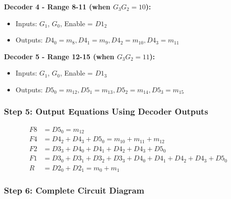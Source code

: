 \documentclass[12pt,a4paper]{article}
\begin{document}
\textbf{Decoder 4 - Range 8-11 (when $G_3G_2 = 10$):}
\begin{itemize}
  \item Inputs: $G_1$, $G_0$, Enable = $D1_2$
  \item Outputs: $D4_0 = m_8, D4_1 = m_9, D4_2 = m_{10}, D4_3 = m_{11}$
\end{itemize}

\textbf{Decoder 5 - Range 12-15 (when $G_3G_2 = 11$):}
\begin{itemize}
  \item Inputs: $G_1$, $G_0$, Enable = $D1_3$
  \item Outputs: $D5_0 = m_{12}, D5_1 = m_{13}, D5_2 = m_{14}, D5_3 = m_{15}$
\end{itemize}

\subsubsection{Step 5: Output Equations Using Decoder Outputs}

\begin{align}
F8 &= D5_0 = m_{12} \\
F4 &= D4_2 + D4_3 + D5_0 = m_{10} + m_{11} + m_{12} \\
F2 &= D3_3 + D4_0 + D4_1 + D4_2 + D4_3 + D5_0 \\
F1 &= D3_0 + D3_1 + D3_2 + D3_3 + D4_0 + D4_1 + D4_2 + D4_3 + D5_0 \\
R &= D2_0 + D2_1 = m_0 + m_1
\end{align}

\newpage
\subsubsection{Step 6: Complete Circuit Diagram}
\end{document}
